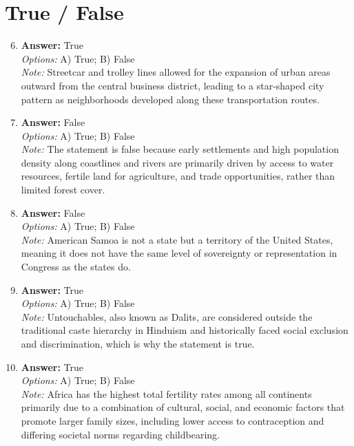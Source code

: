 \documentclass[12pt]{article}
\begin{document}
\section*{True / False}
\begin{enumerate}[label=\arabic*.]
\setcounter{enumi}{5}
\item \textbf{Answer:} True
\\ \textit{Options:} A) True; B) False
\\ \textit{Note:} Streetcar and trolley lines allowed for the expansion of urban areas outward from the central business district, leading to a star-shaped city pattern as neighborhoods developed along these transportation routes.
\item \textbf{Answer:} False
\\ \textit{Options:} A) True; B) False
\\ \textit{Note:} The statement is false because early settlements and high population density along coastlines and rivers are primarily driven by access to water resources, fertile land for agriculture, and trade opportunities, rather than limited forest cover.
\item \textbf{Answer:} False
\\ \textit{Options:} A) True; B) False
\\ \textit{Note:} American Samoa is not a state but a territory of the United States, meaning it does not have the same level of sovereignty or representation in Congress as the states do.
\item \textbf{Answer:} True
\\ \textit{Options:} A) True; B) False
\\ \textit{Note:} Untouchables, also known as Dalits, are considered outside the traditional caste hierarchy in Hinduism and historically faced social exclusion and discrimination, which is why the statement is true.
\item \textbf{Answer:} True
\\ \textit{Options:} A) True; B) False
\\ \textit{Note:} Africa has the highest total fertility rates among all continents primarily due to a combination of cultural, social, and economic factors that promote larger family sizes, including lower access to contraception and differing societal norms regarding childbearing.
\end{enumerate}
\end{document}
